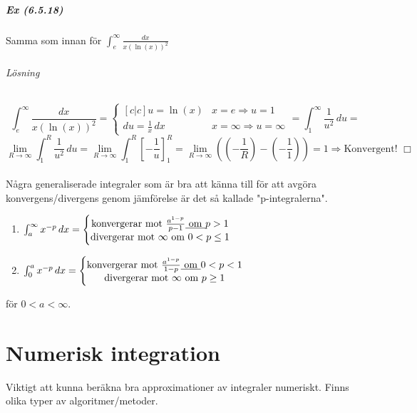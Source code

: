 \paragraph{Ex (6.5.18)} Samma som innan för $\int_e^\infty\frac{dx}{x(\ln(x))^2}$
\subparagraph{Lösning}
\begin{equation*}
    \int_e^\infty\frac{dx}{x(\ln(x))^2}=
    \left\lbrace
    \begin{matrix}[c|c]
        u=\ln(x)            & x=e\Rightarrow u=1           \\
        du=\frac{1}{x}\, dx & x=\infty\Rightarrow u=\infty
    \end{matrix}
    \right.=
    \int_1^\infty\frac{1}{u^2}\, du=
\end{equation*}
\begin{equation*}
    \lim_{R\to\infty}\int_1^R\frac{1}{u^2}\, du=
    \lim_{R\to\infty}\int_1^R[-\frac{1}{u}]_1^R=
    \lim_{R\to\infty}((-\frac{1}{R})-(-\frac{1}{1}))=
    1\Rightarrow\text{Konvergent! }\Box
\end{equation*}
~\\
Några generaliserade integraler som är bra att känna till för att avgöra konvergens/divergens genom jämförelse är det så kallade "p-integralerna".
\begin{enumerate}
    \item $\int_a^\infty x^{-p}\, dx=
              \left\lbrace
              \begin{matrix}
                  \text{konvergerar mot }\frac{a^{1-p}}{p-1}\text{\underline{ om }} p>1 \\
                  \text{divergerar mot }\infty \text{ om } 0<p\leq 1
              \end{matrix}
              \right.$
    \item $\int_0^a x^{-p}\, dx=
              \left\lbrace
              \begin{matrix}
                  \text{konvergerar mot }\frac{a^{1-p}}{1-p}\text{\underline{ om }} 0<p<1 \\
                  \text{divergerar mot }\infty \text{ om } p\geq 1
              \end{matrix}
              \right.$
\end{enumerate}
för $0<a<\infty$.\\

\chapter{Numerisk integration}
Viktigt att kunna beräkna bra approximationer av integraler numeriskt.
Finns olika typer av algoritmer/metoder.


